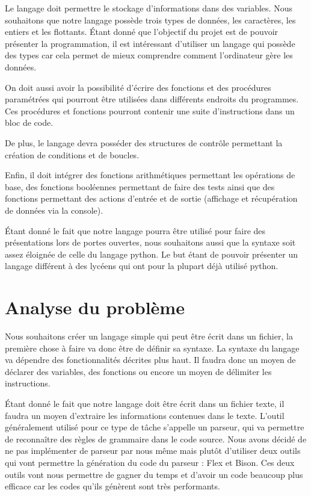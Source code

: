 \documentclass[a4paper]{article}%
\begin{document}
Le langage doit permettre le stockage d'informations dans des variables. Nous
souhaitons que notre langage possède trois types de données, les caractères, les
entiers et les flottants. Étant donné que l'objectif du projet est de pouvoir
présenter la programmation, il est intéressant d'utiliser un langage qui possède
des types car cela permet de mieux comprendre comment l'ordinateur gère les
données.

On doit aussi avoir la possibilité d'écrire des fonctions et des procédures
paramétrées qui pourront être utilisées dans différents endroits du programmes.
Ces procédures et fonctions pourront contenir une suite d'instructions dans un
bloc de code.

De plus, le langage devra posséder des structures de contrôle permettant la
création de conditions et de boucles.

Enfin, il doit intégrer des fonctions arithmétiques permettant les
opérations de base, des fonctions booléennes permettant de faire des
tests ainsi que des fonctions permettant des actions d'entrée et de sortie
(affichage et récupération de données via la console).

Étant donné le fait que notre langage pourra être utilisé pour faire des
présentations lors de portes ouvertes, nous souhaitons aussi que la syntaxe soit
assez éloignée de celle du langage python. Le but étant de pouvoir présenter
un langage différent à des lycéens qui ont pour la plupart déjà utilisé python.

\section{Analyse du problème}

Nous souhaitons créer un langage simple qui peut être écrit dans un fichier, la
première chose à faire va donc être de définir sa syntaxe. La syntaxe du langage
va dépendre des fonctionnalités décrites plus haut. Il faudra donc un moyen de
déclarer des variables, des fonctions ou encore un moyen de délimiter les
instructions.

Étant donné le fait que notre langage doit être écrit dans un fichier texte, il
faudra un moyen d'extraire les informations contenues dans le texte. L'outil
généralement utilisé pour ce type de tâche s'appelle un parseur, qui va
permettre de reconnaître des règles de grammaire dans le code source. Nous avons
décidé de ne pas implémenter de parseur par nous même mais plutôt d'utiliser
deux outils qui vont permettre la génération du code du parseur : Flex et Bison.
Ces deux outils vont nous permettre de gagner du temps et d'avoir un code
beaucoup plus efficace car les codes qu'ils génèrent sont très performants.
\end{document}
